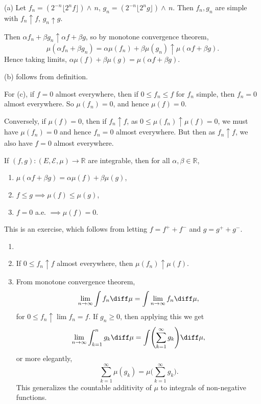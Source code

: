 \documentclass[12pt]{article}
\begin{document}
\begin{proofbox}
	(a) Let $f_n = (2^{-n}\lfloor 2^n f \rfloor) \wedge \, n$, $g_n = (2^{-n}\lfloor 2^n g \rfloor) \wedge \, n$. Then $f_n, g_n$ are simple with $f_n \uparrow f$, $g_n \uparrow g$.

	Then $\alpha f_n + \beta g_n \uparrow \alpha f + \beta g$, so by monotone convergence theorem,
	\[
	\mu(\alpha f_n + \beta g_n) = \alpha \mu(f_n) + \beta \mu(g_n) \uparrow \mu(\alpha f + \beta g).
	\]
	Hence taking limits, $\alpha \mu(f) + \beta \mu(g) = \mu(\alpha f + \beta g)$.

	(b) follows from definition.

	For (c), if $f = 0$ almost everywhere, then if $0 \leq f_n \leq f$ for $f_n$ simple, then $f_n = 0$ almost everywhere. So $\mu(f_n) = 0$, and hence $\mu(f) = 0$.

	Conversely, if $\mu(f) = 0$, then if $f_n \uparrow f$, as $0 \leq \mu(f_n) \uparrow \mu(f) = 0$, we must have $\mu(f_n) = 0$ and hence $f_n = 0$ almost everywhere. But then as $f_n \uparrow f$, we also have $f = 0$ almost everywhere.
\end{proofbox}

\begin{theorem}
	If $(f, g) : (E, \mathcal{E}, \mu) \to \mathbb{R}$ are integrable, then for all $\alpha, \beta \in \mathbb{R}$,
\begin{enumerate}[\normalfont(a)]
	\item $\mu(\alpha f + \beta g) = \alpha \mu(f) + \beta \mu(g)$,
	\item $f \leq g \implies \mu(f) \leq \mu(g)$,
	\item $f = 0$ a.e. $\implies \mu(f) = 0$.
\end{enumerate}
\end{theorem}

\begin{proofbox}
	This is an exercise, which follows from letting $f = f^+ + f^-$ and $g = g^+ + g^-$.
\end{proofbox}

\begin{remark}
	\begin{enumerate}
		\item[]
		\item If $0 \leq f_n \uparrow f$ almost everywhere, then $\mu(f_n) \uparrow \mu(f)$.
		\item From monotone convergence theorem,
			\[
			\lim_{n \to \infty} \int f_n \diff \mu = \int \lim_{n \to \infty} f_n \diff \mu,
			\]
			for $0 \leq f_n \uparrow \lim f_n = f$. If $g_n \geq 0$, then applying this we get
			\[
			\lim_{n \to \infty} \int_{k = 1}^{n} g_k \diff \mu = \int \Biggl( \sum_{k = 1}^{\infty} g_k \Biggr) \diff \mu,
			\]
			or more elegantly,
			\[
			\sum_{k = 1}^{\infty} \mu(g_k) = \mu \Biggl( \sum_{k = 1}^{\infty} g_k \Biggr).
			\]
			This generalizes the countable additivity of $\mu$ to integrals of non-negative functions.
	\end{enumerate}
\end{remark}
\end{document}
